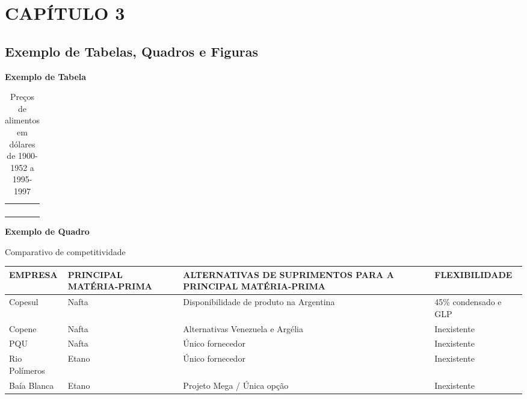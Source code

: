 \chapter{CAPÍTULO 3}
\section{Exemplo de Tabelas, Quadros e Figuras}

 {\centering\bfseries\color{red}
  Exemplo de Tabela
  \par}

\begin{table}[ht]
	\centering
	\caption{Preços de alimentos em dólares de 1900-1952 a
		1995-1997}
	\begin{supertabular}{m{3.6cm}m{3.7cm}m{3.6cm}m{3.0cm}}
		\hline
		 &
		 &
		 &
		\centering{}\\\hline
		 &
		 &
		 &
		\centering{}\\
		 &
		 &
		 &
		\centering{}\\
		 &
		 &
		 &
		\centering{}\\
		 &
		 &
		 &
		\centering{}\\\hline
	\end{supertabular}
	\label{tab:alimentos}
\end{table}

\bigskip

{\centering\bfseries\color{red}
	Exemplo de Quadro
	\par}

\begin{quadro}[htb]
	\centering
	\caption{Comparativo de competitividade}
	\begin{supertabular}{|m{2.5cm}|m{2.5cm}|m{6.0cm}|m{3.0cm}|}
		\hline
		{ EMPRESA } &
		{ PRINCIPAL MATÉRIA-PRIMA } &
		{ ALTERNATIVAS DE SUPRIMENTOS PARA A PRINCIPAL MATÉRIA-PRIMA }
		&
		{ FLEXIBILIDADE }\\\hline
		{ Copesul } &
		{ Nafta } &
		{ Disponibilidade de produto na Argentina} &
		{ 45\% condensado e GLP }\\\hline
		{ Copene } &
		{ Nafta } &
		{ Alternativas Venezuela e Argélia } &
		{ Inexistente }\\\hline
		{ PQU } &
		{ Nafta } &
		{ Único fornecedor } &
		{ Inexistente }\\\hline
		{ Rio Polímeros } &
		{ Etano } &
		{ Único fornecedor } &
		{ Inexistente }\\\hline
		{ Baía Blanca } &
		{ Etano } &
		{ Projeto Mega / Única opção } &
		{ Inexistente }\\\hline
	\end{supertabular}
	\label{quad:quadro1}
\end{quadro}


